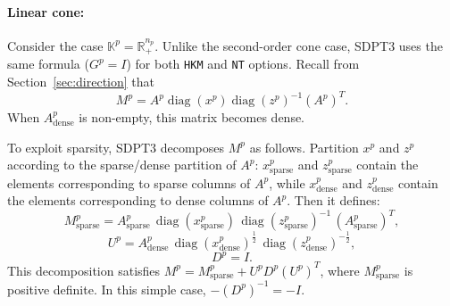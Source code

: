 \paragraph{Linear cone:}
Consider the case $\mathbb{K}^p = \mathbb{R}^{n_p}_+$. 
Unlike the second-order cone case, SDPT3 uses the same formula ($G^p=I$) 
for both \texttt{HKM} and \texttt{NT} options.
Recall from Section~\ref{sec:direction} that
\[
  M^p = A^p \operatorname{diag}(x^p) \operatorname{diag}(z^p)^{-1} (A^p)^T.
\]
When $A^p_{\mathrm{dense}}$ is non-empty, this matrix becomes dense.

To exploit sparsity, SDPT3 decomposes $M^p$ as follows.
Partition $x^p$ and $z^p$ according to the sparse/dense partition of $A^p$:
$x^p_{\mathrm{sparse}}$ and $z^p_{\mathrm{sparse}}$ contain the elements corresponding to sparse columns of $A^p$,
while $x^p_{\mathrm{dense}}$ and $z^p_{\mathrm{dense}}$ contain the elements corresponding to dense columns of $A^p$.
Then it defines:
\[
   M^p_{\mathrm{sparse}}
   = A^p_{\mathrm{sparse}}
     \,\operatorname{diag}(x^p_{\mathrm{sparse}})
     \,\operatorname{diag}(z^p_{\mathrm{sparse}})^{-1}
     \,(A^p_{\mathrm{sparse}})^T,
\]
\[
   U^p
   = A^p_{\mathrm{dense}}
     \,\operatorname{diag}(x^p_{\mathrm{dense}})^{\tfrac12}
     \,\operatorname{diag}(z^p_{\mathrm{dense}})^{-\tfrac12},
\]
\[ D^p = I. \]
This decomposition satisfies $M^p = M^p_{\mathrm{sparse}} + U^p D^p (U^p)^T$,
where $M^p_{\mathrm{sparse}}$ is positive definite.
In this simple case, $-(D^p)^{-1} = -I$.
